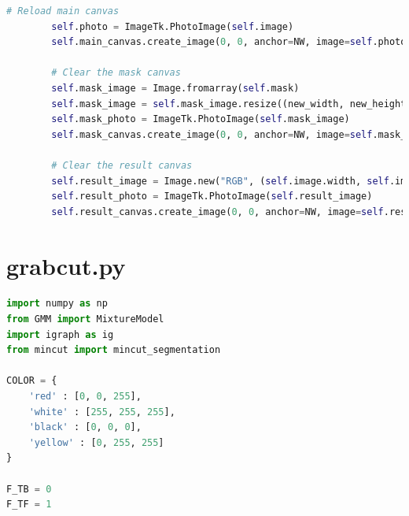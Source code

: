 \begin{lstlisting}[language=Python, basicstyle=\tiny]
        # Reload main canvas
        self.photo = ImageTk.PhotoImage(self.image)
        self.main_canvas.create_image(0, 0, anchor=NW, image=self.photo)

        # Clear the mask canvas
        self.mask_image = Image.fromarray(self.mask)
        self.mask_image = self.mask_image.resize((new_width, new_height)) # <-- untuk resize ukuran
        self.mask_photo = ImageTk.PhotoImage(self.mask_image)
        self.mask_canvas.create_image(0, 0, anchor=NW, image=self.mask_photo)

        # Clear the result canvas
        self.result_image = Image.new("RGB", (self.image.width, self.image.height))
        self.result_photo = ImageTk.PhotoImage(self.result_image)
        self.result_canvas.create_image(0, 0, anchor=NW, image=self.result_photo)

\end{lstlisting}

\section{grabcut.py}
\begin{lstlisting}[language=Python, basicstyle=\tiny]
import numpy as np 
from GMM import MixtureModel
import igraph as ig
from mincut import mincut_segmentation

COLOR = {
    'red' : [0, 0, 255],
    'white' : [255, 255, 255],
    'black' : [0, 0, 0],
    'yellow' : [0, 255, 255]
}

F_TB = 0
F_TF = 1
\end{lstlisting}

